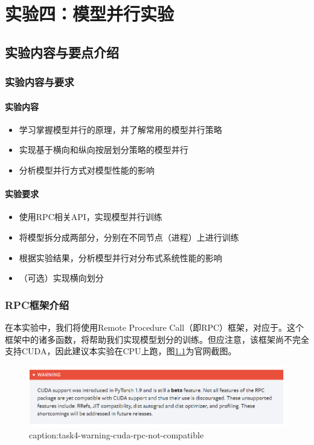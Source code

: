 \chapter{实验四：模型并行实验}

\section{实验内容与要点介绍}

\subsection{实验内容与要求}
\subsubsection{实验内容}
\begin{itemize}
    \item 学习掌握模型并行的原理，并了解常用的模型并行策略
    \item 实现基于横向和纵向按层划分策略的模型并行
    \item 分析模型并行方式对模型性能的影响
\end{itemize}

\subsubsection{实验要求}
\begin{itemize}
    \item 使用RPC相关API，实现模型并行训练
    \item 将模型拆分成两部分，分别在不同节点（进程）上进行训练
    \item 根据实验结果，分析模型并行对分布式系统性能的影响
    \item （可选）实现横向划分
\end{itemize}

\subsection{RPC框架介绍}

在本实验中，我们将使用Remote Procedure Call（即RPC）框架，对应于。这个框架中的诸多函数，将帮助我们实现模型划分的训练。但应注意，该框架尚不完全支持CUDA，因此建议本实验在CPU上跑，图\ref{fig:task4-warning-cuda-rpc-not-compatible}为官网截图。
\begin{figure}[htbp]
	\centering
	\includegraphics[width=1\textwidth]{figures/task4-warning-cuda-rpc-not-compatible.png}
	\caption{caption:task4-warning-cuda-rpc-not-compatible}
	\label{fig:task4-warning-cuda-rpc-not-compatible}
\end{figure}

